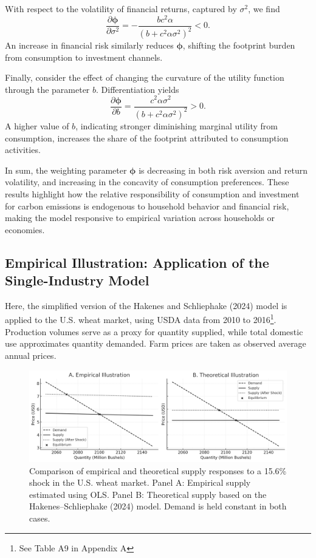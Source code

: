 \documentclass[12pt,a4paper]{article}%
\begin{document}
With respect to the volatility of financial returns, captured by \( \sigma^2 \), we find
\[
\frac{\partial \boldsymbol{\phi}}{\partial \sigma^2} = -\frac{b c^2 \alpha}{{(b + c^2 \alpha \sigma^2)}^2} < 0.
\]
An increase in financial risk similarly reduces \( \boldsymbol{\phi} \), shifting the footprint burden from consumption to investment channels.

Finally, consider the effect of changing the curvature of the utility function through the parameter \( b \). Differentiation yields
\[
\frac{\partial \boldsymbol{\phi}}{\partial b} = \frac{c^2 \alpha \sigma^2}{{(b + c^2 \alpha \sigma^2)}^2} > 0.
\]
A higher value of \( b \), indicating stronger diminishing marginal utility from consumption, increases the share of the footprint attributed to consumption activities.

In sum, the weighting parameter \( \boldsymbol{\phi} \) is decreasing in both risk aversion and return volatility, and increasing in the concavity of consumption preferences. These results highlight how the relative responsibility of consumption and investment for carbon emissions is endogenous to household behavior and financial risk, making the model responsive to empirical variation across households or economies.

\subsection{Empirical Illustration: Application of the Single-Industry Model}

Here, the simplified version of the Hakenes and Schliephake (2024) model is applied to the U.S. wheat market, using USDA data from 2010 to 2016\footnote{See Table A9 in Appendix A}. Production volumes serve as a proxy for quantity supplied, while total domestic use approximates quantity demanded. Farm prices are taken as observed average annual prices.

\begin{figure}[ht]
    \centering
    \includegraphics[width=\textwidth]{Hakenes illustration.png}
    \caption{\small{Comparison of empirical and theoretical supply responses to a 15.6\% shock in the U.S. wheat market. Panel A: Empirical supply estimated using OLS. Panel B: Theoretical supply based on the Hakenes–Schliephake (2024) model. Demand is held constant in both cases.}}
\end{figure}
\end{document}

